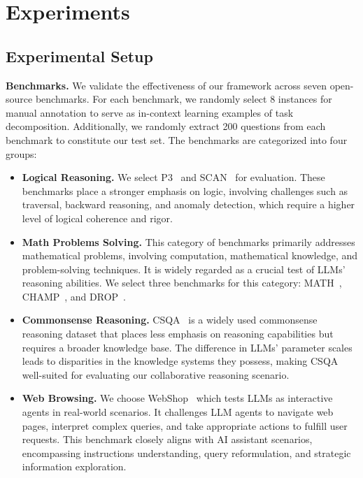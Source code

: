 \vspace{-2mm}
\section{Experiments}


\subsection{Experimental Setup}

\textbf{Benchmarks.}
We validate the effectiveness of our framework across seven open-source benchmarks.
For each benchmark, we randomly select 8 instances for manual annotation to serve as in-context learning examples of task decomposition. Additionally, we randomly extract 200 questions from each benchmark to constitute our test set. The benchmarks are categorized into four groups:
\begin{itemize}
    \item \textbf{Logical Reasoning.} 
    We select P3~\cite{schuster2021programming} and SCAN~\cite{lake2018generalization} for evaluation.
    These benchmarks place a stronger emphasis on logic, involving challenges such as traversal, backward reasoning, and anomaly detection, which require a higher level of logical coherence and rigor.
    \item \textbf{Math Problems Solving.} This category of benchmarks primarily addresses mathematical problems, involving computation, mathematical knowledge, and problem-solving techniques. It is widely regarded as a crucial test of LLMs' reasoning abilities. We select three benchmarks for this category: MATH~\cite{hendrycks2021measuring}, CHAMP~\cite{mao2024champ}, and DROP~\cite{dua2019drop}.
    \item \textbf{Commonsense Reasoning.}  CSQA~\cite{talmor2018commonsenseqa} is a widely used commonsense reasoning dataset that places less emphasis on reasoning capabilities but requires a broader knowledge base. The difference in LLMs' parameter scales leads to disparities in the knowledge systems they possess, making CSQA well-suited for evaluating our collaborative reasoning scenario.
    \item \textbf{Web Browsing.} We choose WebShop~\cite{yao2022webshop} which tests LLMs as interactive agents in real-world scenarios. It challenges LLM agents to navigate web pages, interpret complex queries, and take appropriate actions to fulfill user requests.
    This benchmark closely aligns with AI assistant scenarios, encompassing  instructions understanding, query reformulation, and strategic information exploration.
\end{itemize}


